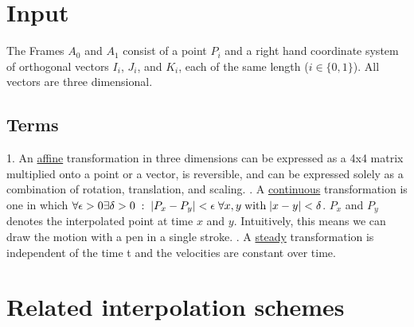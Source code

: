\documentclass[journal, letterpaper]{IEEEtran}
\begin{document}
\section{Input}
The Frames $A_0$ and $A_1$ consist of a point $P_i$ and a right hand coordinate system of orthogonal vectors $I_i$, $J_i$, and $K_i$, each of the same length ($i \in \{0,1\}$). All vectors are three dimensional.
\subsection{Terms} 
1. An \underline{affine} transformation in three dimensions can be expressed as a 4x4 matrix multiplied onto a point or a vector, is reversible, and can be expressed solely as a combination of rotation, translation, and scaling.
. A \underline{continuous} transformation is one in which $\forall \epsilon>0 \\ \exists \delta>0 \; : \; |P_x - P_y|<\epsilon \; \forall x,y \; \text{with} \; |x-y|<\delta$. $P_x$ and $P_y$ denotes the interpolated point at time $x$ and $y$. Intuitively, this means we can draw the motion with a pen in a single stroke.
. A \underline{steady} transformation is independent of the time t and the velocities are constant over time. 

\section{Related interpolation schemes}
\end{document}
